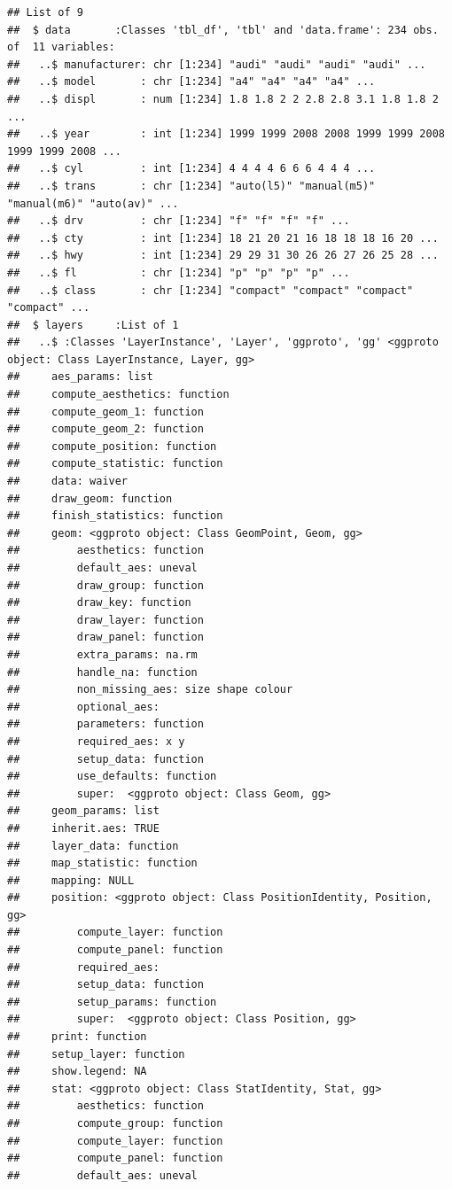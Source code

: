 \documentclass[]{book}
\begin{document}
\begin{verbatim}
## List of 9
##  $ data       :Classes 'tbl_df', 'tbl' and 'data.frame': 234 obs. of  11 variables:
##   ..$ manufacturer: chr [1:234] "audi" "audi" "audi" "audi" ...
##   ..$ model       : chr [1:234] "a4" "a4" "a4" "a4" ...
##   ..$ displ       : num [1:234] 1.8 1.8 2 2 2.8 2.8 3.1 1.8 1.8 2 ...
##   ..$ year        : int [1:234] 1999 1999 2008 2008 1999 1999 2008 1999 1999 2008 ...
##   ..$ cyl         : int [1:234] 4 4 4 4 6 6 6 4 4 4 ...
##   ..$ trans       : chr [1:234] "auto(l5)" "manual(m5)" "manual(m6)" "auto(av)" ...
##   ..$ drv         : chr [1:234] "f" "f" "f" "f" ...
##   ..$ cty         : int [1:234] 18 21 20 21 16 18 18 18 16 20 ...
##   ..$ hwy         : int [1:234] 29 29 31 30 26 26 27 26 25 28 ...
##   ..$ fl          : chr [1:234] "p" "p" "p" "p" ...
##   ..$ class       : chr [1:234] "compact" "compact" "compact" "compact" ...
##  $ layers     :List of 1
##   ..$ :Classes 'LayerInstance', 'Layer', 'ggproto', 'gg' <ggproto object: Class LayerInstance, Layer, gg>
##     aes_params: list
##     compute_aesthetics: function
##     compute_geom_1: function
##     compute_geom_2: function
##     compute_position: function
##     compute_statistic: function
##     data: waiver
##     draw_geom: function
##     finish_statistics: function
##     geom: <ggproto object: Class GeomPoint, Geom, gg>
##         aesthetics: function
##         default_aes: uneval
##         draw_group: function
##         draw_key: function
##         draw_layer: function
##         draw_panel: function
##         extra_params: na.rm
##         handle_na: function
##         non_missing_aes: size shape colour
##         optional_aes: 
##         parameters: function
##         required_aes: x y
##         setup_data: function
##         use_defaults: function
##         super:  <ggproto object: Class Geom, gg>
##     geom_params: list
##     inherit.aes: TRUE
##     layer_data: function
##     map_statistic: function
##     mapping: NULL
##     position: <ggproto object: Class PositionIdentity, Position, gg>
##         compute_layer: function
##         compute_panel: function
##         required_aes: 
##         setup_data: function
##         setup_params: function
##         super:  <ggproto object: Class Position, gg>
##     print: function
##     setup_layer: function
##     show.legend: NA
##     stat: <ggproto object: Class StatIdentity, Stat, gg>
##         aesthetics: function
##         compute_group: function
##         compute_layer: function
##         compute_panel: function
##         default_aes: uneval

\end{verbatim}
\end{document}
